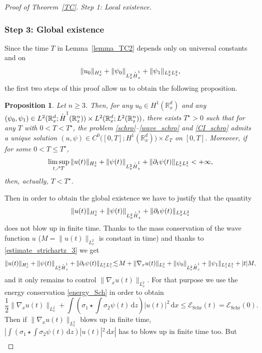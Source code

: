 \documentclass[11pt]{article}
\DeclareRobustCommand{\accentset}[2]{\overset{#1}{#2}}
\newtheorem{proposition}[lemma]{Proposition}
\theoremstyle{definition}
\newcommand*{\overbigdot}[1]{%
\accentset{\mbox{\large\bfseries .}}{#1}}
\newenvironment{ProofOf}[1]{\begin{proof}[Proof of #1]}{\end{proof}}
\newcommand{\R}{\mathbb{R}}
\newcommand{\ud}{\, {\mathrm{d}}}
\begin{document}
\begin{ProofOf}{Theorem~\ref{TC}. Step 1: Local existence}
\subsubsection*{Step 3: Global existence} Since the time $T$ in Lemma~\ref{lemma_TC2} depends only on universal constants and on\vspace*{-3pt}
\[
\|u_{0}\|_{H_{x}^{1}}+\|\psi_{0}\|_{L_{x}^{2}\overbigdot{H}_{z}^{1}}+\|\psi_{1}\|_{L_{x}^{2}L_{z}^{2}},
\]
the first two steps of this proof allow us to obtain the following proposition.
\begin{proposition}
Let $n\geq 3$. Then, for any $u_{0}\in H^{1}(\R_{x}^{d})$ and any $(\psi_{0},\psi_{1})\in L^{2}(\R_{x}^{d};\overbigdot{H}^{1}(\R_{z}^{n}))\times L^{2}(\R_{x}^{d};L^{2}(\R_{z}^{n}))$, there exists $T^{\star}>0$ such that for any $T$ with $0<T<T^{\star}$, the problem \eqref{schro}--\eqref{wave_schro} and \eqref{CI_schro} admits a unique solution \hbox{$(u,\psi)\in C^{0}\bigl([0,T];H^{1}(\R_{x}^{d})\bigr)\times\mathcal{E}_{T}$} on $[0,T]$. Moreover, if for some $0<T\leq T^{\star}$,
\[
\underset{t\nearrow T}{\limsup}\,\|u(t)\|_{H_{x}^{1}}+\|\psi(t)\|_{L_{x}^{2}\overbigdot{H}_{z}^{1}}+\|\partial_{t}\psi(t)\|_{L_{x}^{2}L_{z}^{2}}<+\infty,
\]
then, actually, $T<T^{\star}$.
\end{proposition}
Then in order to obtain the global existence we have to justify that the quantity
\[
\|u(t)\|_{H_{x}^{1}}+\|\psi(t)\|_{L_{x}^{2}\overbigdot{H}_{z}^{1}}+\|\partial_{t}\psi(t)\|_{L_{x}^{2}L_{z}^{2}}
\]
does not blow up in finite time. Thanks to the mass conservation of the wave function $u$ ($M=\|u(t)\|_{L_{x}^{2}}$ is constant in time) and thanks to \eqref{estimate_strichartz_3} we get
\[
\|u(t)\|_{H_{x}^{1}}+\|\psi(t)\|_{L_{x}^{2}\overbigdot{H}_{z}^{1}}+\|\partial_{t}\psi(t)\|_{L_{x}^{2}L_{z}^{2}}\!\lesssim\! M+\|\nabla_{x}u(t)\|_{L_{x}^{2}}+\|\psi_{0}\|_{L_{x}^{2}\overbigdot{H}_{z}^{1}}+\|\psi_{1}\|_{L_{x}^{2}L_{z}^{2}}+|t|M,
\]
and it only remains to control $\|\nabla_{x}u(t)\|_{L_{x}^{2}}$. For that purpose we use the energy conservation
\eqref{energy_Sch}
in order to obtain
\[
\frac{1}{2}\|\nabla_{x}u(t)\|_{L_{x}^{2}}+\int\left(\sigma_{1}\star\int\sigma_{2}\psi(t)\ud z\right)|u(t)|^{2}\ud x\leq \mathcal E_{\mathrm {Schr}}(t)= \mathcal E_{\mathrm {Schr}}(0).
\]
Then if $\|\nabla_{x}u(t)\|_{L_{x}^{2}}$ blows up in finite time, $|\int(\sigma_{1}\star\int\sigma_{2}\psi(t)\ud z)|u(t)|^{2}\ud x|$ has to blows up in finite time too. But
\begin{equation}\label{estimate_utile}
\begin{split}

\end{split}
\end{equation}
\end{ProofOf}
\end{document}
